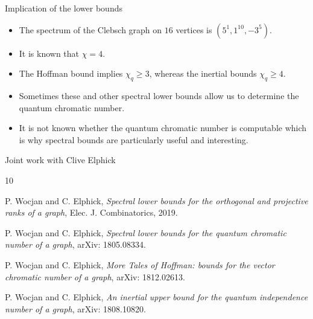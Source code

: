 \documentclass{beamer}
\renewcommand{\>}{\rangle}
\newcommand{\<}{\langle}
\begin{document}
%

\begin{frame}{Implication of the lower bounds}
\begin{itemize}
\item The spectrum of the Clebsch graph on $16$ vertices is $(5^1, 1^10, -3^5)$.

\item It is known that $\chi=4$.

\item The Hoffman bound implies $\chi_q \ge 3$, whereas the inertial bounds $\chi_q \ge 4$.

\item Sometimes these and other spectral lower bounds allow us to determine the quantum chromatic number. 

\item It is not known whether the quantum chromatic number is computable which is why spectral bounds are particularly useful and interesting.
\end{itemize}
\end{frame}

%

\begin{frame}{Joint work with Clive Elphick}

\begin{thebibliography}{10}

P. Wocjan and C. Elphick, \emph{Spectral lower bounds for the orthogonal and projective ranks of a graph}, Elec. J. Combinatorics, 2019.

P. Wocjan and C. Elphick, \emph{Spectral lower bounds for the quantum chromatic number of a graph},  arXiv: 1805.08334. 

P. Wocjan and C. Elphick, \emph{More Tales of Hoffman: bounds for the vector chromatic number of a graph}, arXiv: 1812.02613.

P. Wocjan and C. Elphick, \emph{An inertial upper bound for the quantum independence number of a graph},  arXiv: 1808.10820.
\end{thebibliography}


\end{frame}

%
\end{document}
